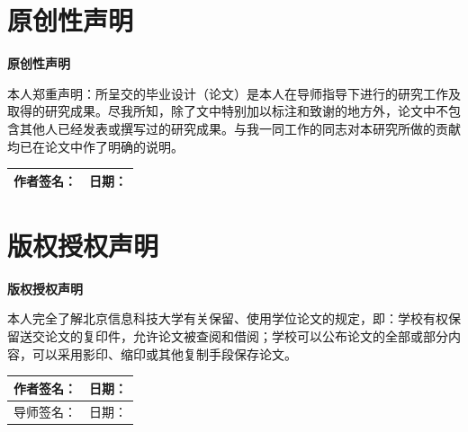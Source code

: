 \documentclass[a4paper,12pt]{ctexart}
\newcommand{\sanhao}{\fontsize{16pt}{24pt}\selectfont}     %
\newcommand{\wuhao}{\fontsize{10.5pt}{15.75pt}\selectfont} %
\begin{document}
\clearpage

\section*{原创性声明}
\thispagestyle{empty}
\begin{center}
    \heiti\sanhao\bfseries 原创性声明
\end{center}
\vspace{2em}

\songti\wuhao
本人郑重声明：所呈交的毕业设计（论文）是本人在导师指导下进行的研究工作及取得的研究成果。尽我所知，除了文中特别加以标注和致谢的地方外，论文中不包含其他人已经发表或撰写过的研究成果。与我一同工作的同志对本研究所做的贡献均已在论文中作了明确的说明。

\vspace{4em}
\begin{tabularx}{\textwidth}{|X|X|}
    \hline
    作者签名：\underline{\hspace{4cm}} & 日期：\underline{\hspace{4cm}} \\
    \hline
\end{tabularx}

\clearpage

\section*{版权授权声明}
\thispagestyle{empty}
\begin{center}
    \heiti\sanhao\bfseries 版权授权声明
\end{center}
\vspace{2em}

\songti\wuhao
本人完全了解北京信息科技大学有关保留、使用学位论文的规定，即：学校有权保留送交论文的复印件，允许论文被查阅和借阅；学校可以公布论文的全部或部分内容，可以采用影印、缩印或其他复制手段保存论文。

\vspace{4em}
\begin{tabularx}{\textwidth}{|X|X|}
    \hline
    作者签名：\underline{\hspace{4cm}} & 日期：\underline{\hspace{4cm}} \\
    \hline
    导师签名：\underline{\hspace{4cm}} & 日期：\underline{\hspace{4cm}} \\
    \hline
\end{tabularx}
\end{document}
